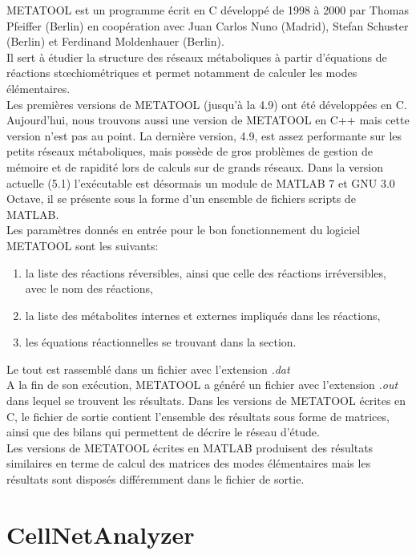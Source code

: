 METATOOL est un programme écrit en C développé de 1998 à 2000 par Thomas Pfeiffer (Berlin) en coopération avec Juan Carlos Nuno (Madrid), Stefan Schuster (Berlin) et Ferdinand Moldenhauer (Berlin).\\
Il sert à étudier la structure des réseaux métaboliques à partir d'équations de réactions stœchiométriques et permet notamment de calculer les modes élémentaires.\\
Les premières versions de METATOOL (jusqu'à la 4.9) ont été développées en C. Aujourd'hui, nous trouvons aussi une version de METATOOL en C++ mais cette version n'est pas au point. La dernière version, 4.9, est assez performante sur les petits réseaux métaboliques, mais possède de gros problèmes de gestion de mémoire et de rapidité lors de calculs sur de grands réseaux.
Dans la version actuelle (5.1) l'exécutable est désormais un module de MATLAB 7 et GNU 3.0 Octave, il se présente sous la forme d'un ensemble de fichiers scripts de MATLAB.\\

Les paramètres donnés en entrée pour le bon fonctionnement du logiciel METATOOL sont les suivants:
\begin{enumerate}
\item la liste des réactions réversibles, ainsi que celle des réactions irréversibles, avec le nom des réactions,
\item la liste des métabolites internes et externes impliqués dans les réactions,
\item les équations réactionnelles se trouvant dans la section.
\end{enumerate}
Le tout est rassemblé dans un fichier avec l'extension \textit{.dat}\\

A la fin de son exécution, METATOOL a généré un fichier avec l'extension \textit{.out} dans lequel se trouvent les résultats. Dans les versions de METATOOL écrites en C, le fichier de sortie contient l'ensemble des résultats sous forme de matrices, ainsi que des bilans qui permettent de décrire le réseau d'étude.\\
Les versions de METATOOL écrites en MATLAB produisent des résultats similaires en terme de calcul des matrices des modes élémentaires mais les résultats sont disposés différemment dans le fichier de sortie.

\section{CellNetAnalyzer}

